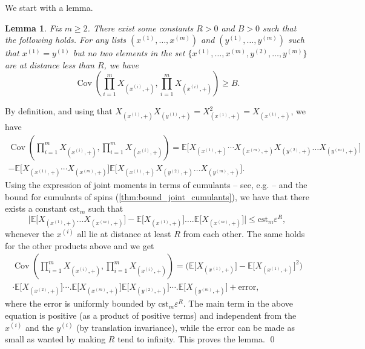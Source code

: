 \documentclass{amsart}
\newcommand{\esper}{\mathbb{E}}
\def\eps{\varepsilon}
\DeclareMathOperator\Cov{Cov}
\numberwithin{equation}{section}
\newtheorem{lemma}[theorem]{Lemma}
\theoremstyle{remark}
\renewenvironment{proof}[1][Proof]{\begin{trivlist}
\item[\hskip \labelsep {\bfseries #1:}]}{\qed\end{trivlist}}
\begin{document}
We start with a lemma.
\begin{lemma}
  \label{lem:cov_Une_Egalite}
  Fix $m \ge 2$.
  There exist some constants $R>0$ and $B>0$ such that the following holds.
  For any lists $(x^{(1)},\dots,x^{(m)})$ and $(y^{(1)},\dots,y^{(m)})$ 
  such that $x^{(1)}=y^{(1)}$ but no two elements in the set $\{x^{(1)},\dots,x^{(m)},y^{(2)},\dots,y^{(m)}\}$
  are at distance less than $R$, we have
  \[\Cov\left( \prod_{i=1}^m X_{(x^{(i)},+)}, \prod_{i=1}^m X_{(x^{(i)},+)} \right) \ge B.\]
\end{lemma}
\begin{proof}
  By definition, and using that $X_{(x^{(1)},+)} X_{(y^{(1)},+)}=X_{(x^{(1)},+)}^2=X_{(x^{(1)},+)}$, we have 
  \begin{multline*}
    \Cov\left( \prod_{i=1}^m X_{(x^{(i)},+)}, \prod_{i=1}^m X_{(x^{(i)},+)} \right) 
  =\esper\big[ X_{(x^{(1)},+)} \cdots X_{(x^{(m)},+)} X_{(y^{(2)},+)} \dots X_{(y^{(m)},+)}\big] \\
  -\esper\big[ X_{(x^{(1)},+)} \cdots X_{(x^{(m)},+)} \big] 
  \esper\big[ X_{(x^{(1)},+)}  X_{(y^{(2)},+)} \dots X_{(y^{(m)},+)}\big].
\end{multline*}
  Using the expression of joint moments in terms of cumulants -- see, e.g. \cite[Eq. (3)]{Valentin} --
  and the bound for cumulants of spins (\cref{thm:bound_joint_cumulants}),
  we have that there exists a constant $\text{cst}_m$ such that
  \[\big|\esper\big[ X_{(x^{(1)},+)} \dots X_{(x^{(m)},+)} \big] -
  \esper\big[ X_{(x^{(1)},+)}] \dots.\esper\big[ X_{(x^{(m)},+)}\big]\big|
  \le \text{cst}_m \eps^R,\]
  whenever the $x^{(i)}$ all lie at distance at least $R$ from each other.
  The same holds for the other products above and we get
  \begin{multline*}
    \Cov\left( \prod_{i=1}^m X_{(x^{(i)},+)}, \prod_{i=1}^m X_{(x^{(i)},+)} \right)
  = \big(\esper\big[ X_{(x^{(1)},+)}\big] - \esper\big[ X_{(x^{(1)},+)}\big]^2\big) \\
  \cdot
  \esper\big[ X_{(x^{(2)},+)}] \cdots.\esper\big[ X_{(x^{(m)},+)}\big]
  \esper\big[ X_{(y^{(2)},+)}] \cdots.\esper\big[ X_{(y^{(m)},+)}\big]
  +\text{error},
\end{multline*}
  where the error is uniformly bounded by $\text{cst}_m \eps^R$.
  The main term in the above equation is positive (as a product of positive terms)
  and independent from the $x^{(i)}$
  and the $y^{(i)}$ (by translation invariance), while the error can be made as small as wanted by making $R$ tend to infinity.
  This proves the lemma.
\end{proof}
\end{document}
